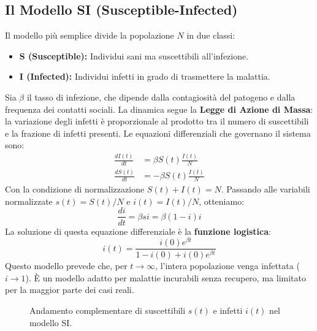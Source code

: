 \subsection{Il Modello SI (Susceptible-Infected)}
Il modello più semplice divide la popolazione $N$ in due classi:
\begin{itemize}
    \item \textbf{S (Susceptible):} Individui sani ma suscettibili all'infezione.
    \item \textbf{I (Infected):} Individui infetti in grado di trasmettere la malattia.
\end{itemize}
Sia $\beta$ il tasso di infezione, che dipende dalla contagiosità del patogeno e dalla frequenza dei contatti sociali. La dinamica segue la \textbf{Legge di Azione di Massa}: la variazione degli infetti è proporzionale al prodotto tra il numero di suscettibili e la frazione di infetti presenti.
Le equazioni differenziali che governano il sistema sono:
\begin{align}
    \frac{dI(t)}{dt} &= \beta S(t) \frac{I(t)}{N} \\
    \frac{dS(t)}{dt} &= -\beta S(t) \frac{I(t)}{N}
\end{align}
Con la condizione di normalizzazione $S(t) + I(t) = N$.
Passando alle variabili normalizzate $s(t) = S(t)/N$ e $i(t) = I(t)/N$, otteniamo:
\begin{equation}
    \frac{di}{dt} = \beta s i = \beta (1-i) i
\end{equation}
La soluzione di questa equazione differenziale è la \textbf{funzione logistica}:
\begin{equation}
    i(t) = \frac{i(0) e^{\beta t}}{1 - i(0) + i(0)e^{\beta t}}
\end{equation}
Questo modello prevede che, per $t \to \infty$, l'intera popolazione venga infettata ($i \to 1$). È un modello adatto per malattie incurabili senza recupero, ma limitato per la maggior parte dei casi reali.

\begin{figure}[h]
\centering
{}
\caption{Andamento complementare di suscettibili $s(t)$ e infetti $i(t)$ nel modello SI.}
\end{figure}

